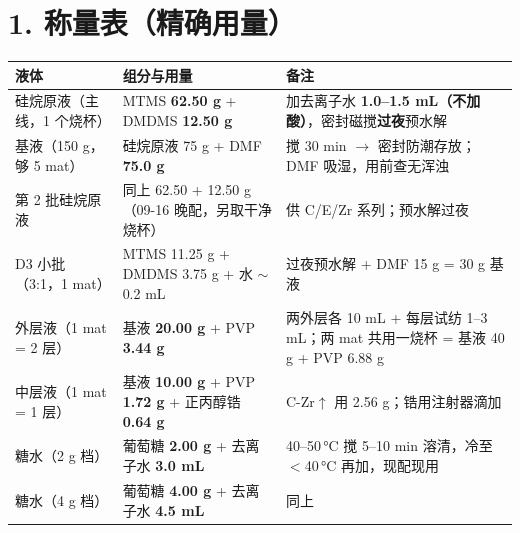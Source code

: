 \documentclass[a4paper, 10pt]{ctexart}
\begin{document}
\section*{1. 称量表（精确用量）}
\begin{tabular}{p{4.0cm}p{5.0cm}p{6.4cm}}
\toprule
液体 & 组分与用量 & 备注 \\
\midrule
硅烷原液（主线，1 个烧杯） & MTMS \textbf{62.50 g} + DMDMS \textbf{12.50 g} & 加去离子水 \textbf{1.0--1.5 mL（不加酸）}，密封磁搅\textbf{过夜}预水解 \\
基液（150 g，够 5 mat） & 硅烷原液 75 g + DMF \textbf{75.0 g} & 搅 30 min $\rightarrow$ 密封防潮存放；DMF 吸湿，用前查无浑浊 \\
第 2 批硅烷原液 & 同上 62.50 + 12.50 g（09-16 晚配，另取干净烧杯） & 供 C/E/Zr 系列；预水解过夜 \\
D3 小批（3:1，1 mat） & MTMS 11.25 g + DMDMS 3.75 g + 水 $\sim$0.2 mL & 过夜预水解 + DMF 15 g = 30 g 基液 \\
外层液（1 mat = 2 层） & 基液 \textbf{20.00 g} + PVP \textbf{3.44 g} & 两外层各 10 mL + 每层试纺 1--3 mL；两 mat 共用一烧杯 = 基液 40 g + PVP 6.88 g \\
中层液（1 mat = 1 层） & 基液 \textbf{10.00 g} + PVP \textbf{1.72 g} + 正丙醇锆 \textbf{0.64 g} & C-Zr$\uparrow$ 用 2.56 g；锆用注射器滴加 \\
糖水（2 g 档） & 葡萄糖 \textbf{2.00 g} + 去离子水 \textbf{3.0 mL} & 40--50\,°C 搅 5--10 min 溶清，冷至 $<$40\,°C 再加，现配现用 \\
糖水（4 g 档） & 葡萄糖 \textbf{4.00 g} + 去离子水 \textbf{4.5 mL} & 同上 \\
\bottomrule
\end{tabular}
\end{document}
